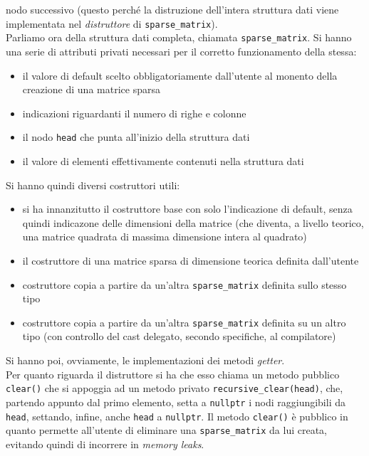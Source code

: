 \documentclass[a4paper,12pt, oneside]{article}
\begin{document}
nodo successivo (questo perché la distruzione dell'intera struttura
dati viene implementata nel \textit{distruttore} di
\texttt{sparse\_matrix}).\\
Parliamo ora della struttura dati completa, chiamata
\texttt{sparse\_matrix}. Si hanno una serie di attributi privati
necessari per il corretto funzionamento della stessa:
\begin{itemize}
  \item il valore di default scelto obbligatoriamente dall'utente al
  monento della creazione di una matrice sparsa
  \item indicazioni riguardanti il numero di righe e colonne
  \item il nodo \texttt{head} che punta all'inizio della struttura
  dati
  \item il valore di elementi effettivamente contenuti nella struttura dati
\end{itemize}
Si hanno quindi diversi costruttori utili:
\begin{itemize}
  \item si ha innanzitutto il costruttore base con solo l'indicazione
  di default, senza quindi indicazone delle dimensioni della matrice
  (che diventa, a livello teorico, una matrice quadrata di massima
  dimensione intera al quadrato)
  \item il costruttore di una matrice sparsa di dimensione teorica
  definita dall'utente
  \item costruttore copia a partire da un'altra
  \texttt{sparse\_matrix} definita sullo stesso tipo
  \item costruttore copia a partire da un'altra
  \texttt{sparse\_matrix} definita su un altro tipo (con controllo del
  cast delegato, secondo specifiche, al compilatore)
\end{itemize}
Si hanno poi, ovviamente, le implementazioni dei metodi
\textit{getter}.\\
Per quanto riguarda il distruttore si ha che esso chiama un metodo
pubblico \texttt{clear()} che si appoggia ad un metodo privato
\texttt{recursive\_clear(head)}, che, partendo appunto dal primo
elemento, setta a \texttt{nullptr} i nodi raggiungibili da
\texttt{head}, settando, infine, anche \texttt{head} a
\texttt{nullptr}. Il metodo \texttt{clear()} è pubblico in quanto
permette all'utente di eliminare una \texttt{sparse\_matrix} da lui
creata, evitando quindi di incorrere in \textit{memory leaks}.
\newpage
\end{document}

